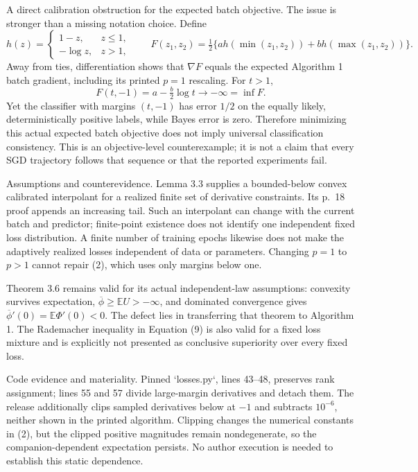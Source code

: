 \documentclass[10pt]{article}
\begin{document}
A direct calibration obstruction for the expected batch objective. The issue is stronger than a missing notation choice. Define \[h(z)=\begin{cases}1-z,&z\le1,\\-\log z,&z>1,\end{cases}
 \qquad
 F(z_1,z_2)=\tfrac12\{a h(\min(z_1,z_2))
                         +b h(\max(z_1,z_2))\}.
 \tag{3}\] Away from ties, differentiation shows that \(\nabla F\) equals the expected Algorithm 1 batch gradient, including its printed \(p=1\) rescaling. For \(t>1\), \[F(t,-1)=a-\tfrac b2\log t\longrightarrow-\infty=\inf F.\] Yet the classifier with margins \((t,-1)\) has error \(1/2\) on the equally likely, deterministically positive labels, while Bayes error is zero. Therefore minimizing this actual expected batch objective does not imply universal classification consistency. This is an objective-level counterexample; it is not a claim that every SGD trajectory follows that sequence or that the reported experiments fail.\par
Assumptions and counterevidence. Lemma 3.3 supplies a bounded-below convex calibrated interpolant for a realized finite set of derivative constraints. Its p. 18 proof appends an increasing tail. Such an interpolant can change with the current batch and predictor; finite-point existence does not identify one independent fixed loss distribution. A finite number of training epochs likewise does not make the adaptively realized losses independent of data or parameters. Changing \(p=1\) to \(p>1\) cannot repair (2), which uses only margins below one.\par
Theorem 3.6 remains valid for its actual independent-law assumptions: convexity survives expectation, \(\overline\phi\ge\mathbb EU>-\infty\), and dominated convergence gives \(\overline\phi'(0)=\mathbb E\Phi'(0)<0\). The defect lies in transferring that theorem to Algorithm 1. The Rademacher inequality in Equation (9) is also valid for a fixed loss mixture and is explicitly not presented as conclusive superiority over every fixed loss.\par
Code evidence and materiality. Pinned `losses.py`, lines 43–48, preserves rank assignment; lines 55 and 57 divide large-margin derivatives and detach them. The release additionally clips sampled derivatives below at \(-1\) and subtracts \(10^{-6}\), neither shown in the printed algorithm. Clipping changes the numerical constants in (2), but the clipped positive magnitudes remain nondegenerate, so the companion-dependent expectation persists. No author execution is needed to establish this static dependence.\par
\end{document}

